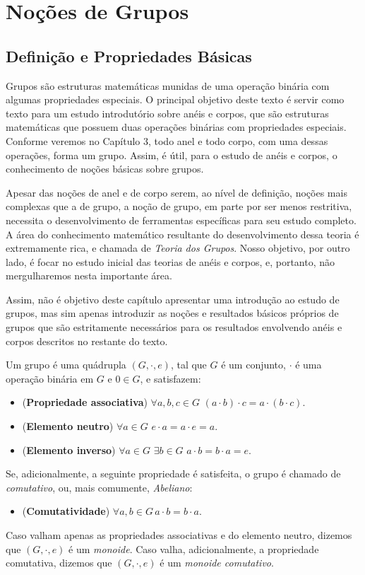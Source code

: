 \chapter{Noções de Grupos}


\section{Definição e Propriedades Básicas}

Grupos são estruturas matemáticas munidas de uma operação binária com algumas propriedades especiais.
O principal objetivo deste texto é servir como texto para um estudo introdutório sobre anéis e corpos, que são estruturas matemáticas que possuem duas operações binárias com propriedades especiais.
Conforme veremos no Capítulo 3, todo anel e todo corpo, com uma dessas operações, forma um grupo.
Assim, é útil, para o estudo de anéis e corpos, o conhecimento de noções básicas sobre grupos.

Apesar das noções de anel e de corpo serem, ao nível de definição, noções mais complexas que a de grupo, a noção de grupo, em parte por ser menos restritiva, necessita o desenvolvimento de ferramentas específicas para seu estudo completo.
A área do conhecimento matemático resultante do desenvolvimento dessa teoria é extremamente rica, e chamada de \emph{Teoria dos Grupos}.
Nosso objetivo, por outro lado, é focar no estudo inicial das teorias de anéis e corpos, e, portanto, não mergulharemos nesta importante área.

Assim, não é objetivo deste capítulo apresentar uma introdução ao estudo de grupos, mas sim apenas introduzir as noções e resultados básicos próprios de grupos que são estritamente necessários para os resultados envolvendo anéis e corpos descritos no restante do texto.

\begin{definition}
Um grupo é uma quádrupla $(G,\cdot,e)$, tal que $G$ é um conjunto, $\cdot$ é uma operação binária em $G$ e $0 \in G$, e satisfazem:

\begin{itemize}
    \item (\textbf{Propriedade associativa}) $\forall a, b, c \in G$ $(a \cdot b) \cdot c = a \cdot (b \cdot c)$.
    \item (\textbf{Elemento neutro}) $\forall a \in G$  $e \cdot a = a \cdot e = a$.
    \item (\textbf{Elemento inverso}) $\forall a \in G$ $\exists b \in G$ $a \cdot b = b \cdot a = e$.
\end{itemize}
Se, adicionalmente, a seguinte propriedade é satisfeita, o grupo é chamado de \emph{comutativo}, ou, mais comumente, \emph{Abeliano}:
\begin{itemize}
    \item (\textbf{Comutatividade}) $\forall a, b \in G\, a \cdot b = b \cdot a$.
\end{itemize}

Caso valham apenas as propriedades associativas e do elemento neutro, dizemos que $(G, \cdot, e)$ é um \emph{monoide}.
Caso valha, adicionalmente, a propriedade comutativa, dizemos que $(G, \cdot, e)$ é um \emph{monoide comutativo}.
\end{definition}

